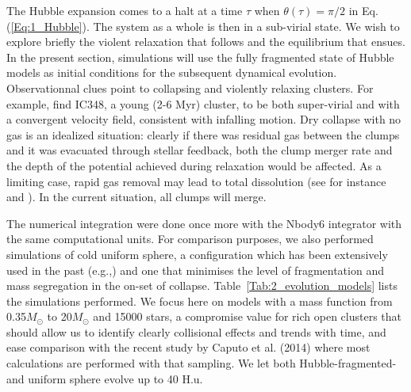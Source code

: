 The Hubble expansion comes to a halt at a time $\tau$ when $\theta(\tau) = \pi/2$  in Eq. (\ref{Eq:1_Hubble}). The system as a whole is then in a sub-virial state. We wish to explore briefly the  violent relaxation that follows and the equilibrium that ensues. In the present section, simulations will use the fully fragmented state of Hubble models as initial conditions for the subsequent dynamical evolution. Observationnal clues point to  collapsing and violently relaxing clusters. For example, \cite{Cottaar15} find IC348, a young (2-6 Myr) cluster, to be both super-virial and with a convergent velocity field, consistent with infalling motion. Dry collapse with no gas is an idealized situation: clearly if there was residual gas between the clumps and it was evacuated through stellar feedback, both the clump merger rate and the depth of the potential achieved during relaxation would be affected. As a limiting case, rapid gas removal may lead to total dissolution (see for instance \citealt{Moeckel12} and \citealt{Fujii16}). In the current situation, all clumps will merge.

The numerical integration were done once more with the Nbody6 integrator with the same computational units. For comparison purposes, we also performed simulations of cold uniform sphere, a configuration which has been extensively used  in the past (e.g.,\citealt{Theis99,Boily02,Barnes09,Caputo14,Benhaiem15}) and one that minimises the level of fragmentation and mass segregation in the on-set of collapse. Table~\ref{Tab:2_evolution_models} lists the simulations performed. We focus here on models with a mass function from 0.35$M_\odot$ to 20$M_\odot$ and 15000 stars, a compromise value for rich open clusters that should allow us to identify clearly collisional effects and trends with time, and ease comparison with the recent study by Caputo et al. (2014) where most calculations are performed with that sampling. We let both Hubble-fragmented- and uniform sphere evolve up to 40 H.u. 


